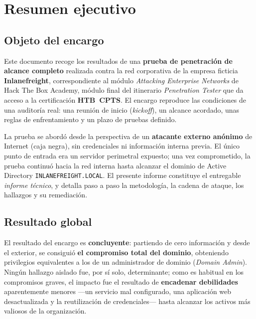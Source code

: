 \documentclass[11pt,a4paper,oneside]{report}
\begin{document}
\chapter{Resumen ejecutivo}

\section{Objeto del encargo}

Este documento recoge los resultados de una \textbf{prueba de penetración de alcance completo} realizada contra la red corporativa de la empresa ficticia \textbf{Inlanefreight}, correspondiente al módulo \emph{Attacking Enterprise Networks} de Hack The Box Academy, módulo final del itinerario \emph{Penetration Tester} que da acceso a la certificación \textbf{HTB~CPTS}. El encargo reproduce las condiciones de una auditoría real: una reunión de inicio (\emph{kickoff}), un alcance acordado, unas reglas de enfrentamiento y un plazo de pruebas definido.

La prueba se abordó desde la perspectiva de un \textbf{atacante externo anónimo} de Internet (caja negra), sin credenciales ni información interna previa. El único punto de entrada era un servidor perimetral expuesto; una vez comprometido, la prueba continuó hacia la red interna hasta alcanzar el dominio de Active Directory \texttt{INLANEFREIGHT.LOCAL}. El presente informe constituye el entregable \emph{informe técnico}, y detalla paso a paso la metodología, la cadena de ataque, los hallazgos y su remediación.

\section{Resultado global}

El resultado del encargo es \textbf{concluyente}: partiendo de cero información y desde el exterior, se consiguió \textbf{el compromiso total del dominio}, obteniendo privilegios equivalentes a los de un administrador de dominio (\emph{Domain Admin}). Ningún hallazgo aislado fue, por sí solo, determinante; como es habitual en los compromisos graves, el impacto fue el resultado de \textbf{encadenar debilidades} aparentemente menores —un servicio mal configurado, una aplicación web desactualizada y la reutilización de credenciales— hasta alcanzar los activos más valiosos de la organización.
\end{document}
